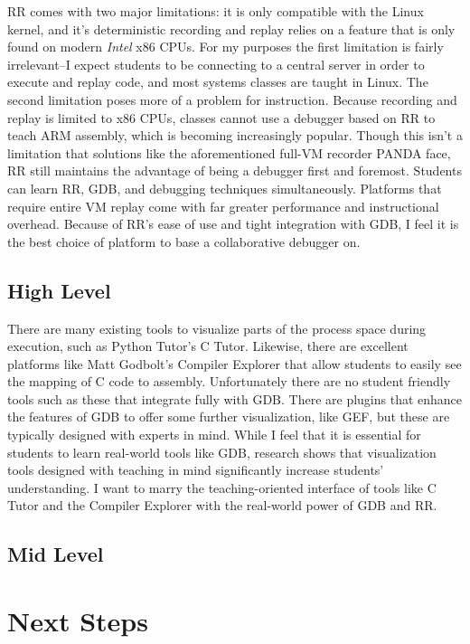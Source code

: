 \documentclass[12pt]{article}
\begin{document}
RR comes with two major limitations: it is only compatible with the
Linux kernel, and it's deterministic recording and replay relies on a
feature that is only found on modern \textit{Intel} x86 CPUs.  For my
purposes the first limitation is fairly irrelevant--I expect students
to be connecting to a central server in order to execute and replay
code, and most systems classes are taught in Linux.  The second
limitation poses more of a problem for instruction.  Because recording
and replay is limited to x86 CPUs, classes cannot use a debugger based
on RR to teach ARM assembly, which is becoming increasingly popular.
Though this isn't a limitation that solutions like the aforementioned
full-VM recorder PANDA face, RR still maintains the advantage of being
a debugger first and foremost.  Students can learn RR, GDB, and
debugging techniques simultaneously.  Platforms that require entire VM
replay come with far greater performance and instructional overhead.
Because of RR's ease of use and tight integration with GDB, I feel it
is the best choice of platform to base a collaborative debugger on.

\subsection{High Level}

There are many existing tools to visualize parts of the process space
during execution, such as Python Tutor's C Tutor\cite{pythontutor}.
Likewise, there are excellent platforms like Matt Godbolt's Compiler
Explorer\cite{godbolt} that allow students to easily see the mapping
of C code to assembly.  Unfortunately there are no student friendly
tools such as these that integrate fully with GDB.  There are plugins
that enhance the features of GDB to offer some further visualization,
like GEF\cite{gef}, but these are typically designed with experts in
mind.  While I feel that it is essential for students to learn
real-world tools like GDB, research shows that visualization tools
designed with teaching in mind significantly increase students'
understanding\cite{10.1145/3328778.3366894}.  I want to marry the
teaching-oriented interface of tools like C Tutor and the Compiler
Explorer with the real-world power of GDB and RR.

\subsection{Mid Level}

\section{Next Steps}

\pagebreak

{}
\end{document}
